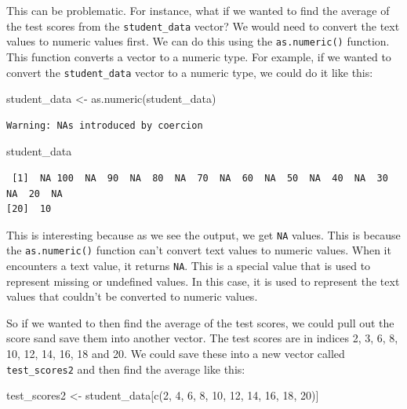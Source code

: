 \documentclass[
  letterpaper,
  DIV=11,
  numbers=noendperiod]{scrreprt}
\newenvironment{Shaded}{\begin{snugshade}}{\end{snugshade}}
\newcommand{\DecValTok}[1]{\textcolor[rgb]{0.68,0.00,0.00}{#1}}
\newcommand{\FunctionTok}[1]{\textcolor[rgb]{0.28,0.35,0.67}{#1}}
\newcommand{\NormalTok}[1]{\textcolor[rgb]{0.00,0.23,0.31}{#1}}
\newcommand{\OtherTok}[1]{\textcolor[rgb]{0.00,0.23,0.31}{#1}}
\begin{document}
This can be problematic. For instance, what if we wanted to find the
average of the test scores from the \texttt{student\_data} vector? We
would need to convert the text values to numeric values first. We can do
this using the \texttt{as.numeric()} function. This function converts a
vector to a numeric type. For example, if we wanted to convert the
\texttt{student\_data} vector to a numeric type, we could do it like
this:

\begin{Shaded}
\begin{Highlighting}[]
\NormalTok{student\_data }\OtherTok{\textless{}{-}} \FunctionTok{as.numeric}\NormalTok{(student\_data)}
\end{Highlighting}
\end{Shaded}

\begin{verbatim}
Warning: NAs introduced by coercion
\end{verbatim}

\begin{Shaded}
\begin{Highlighting}[]
\NormalTok{student\_data}
\end{Highlighting}
\end{Shaded}

\begin{verbatim}
 [1]  NA 100  NA  90  NA  80  NA  70  NA  60  NA  50  NA  40  NA  30  NA  20  NA
[20]  10
\end{verbatim}

This is interesting because as we see the output, we get \texttt{NA}
values. This is because the \texttt{as.numeric()} function can't convert
text values to numeric values. When it encounters a text value, it
returns \texttt{NA}. This is a special value that is used to represent
missing or undefined values. In this case, it is used to represent the
text values that couldn't be converted to numeric values.

So if we wanted to then find the average of the test scores, we could
pull out the score sand save them into another vector. The test scores
are in indices 2, 3, 6, 8, 10, 12, 14, 16, 18 and 20. We could save
these into a new vector called \texttt{test\_scores2} and then find the
average like this:

\begin{Shaded}
\begin{Highlighting}[]
\NormalTok{test\_scores2 }\OtherTok{\textless{}{-}}\NormalTok{ student\_data[}\FunctionTok{c}\NormalTok{(}\DecValTok{2}\NormalTok{, }\DecValTok{4}\NormalTok{, }\DecValTok{6}\NormalTok{, }\DecValTok{8}\NormalTok{, }\DecValTok{10}\NormalTok{, }\DecValTok{12}\NormalTok{, }\DecValTok{14}\NormalTok{, }\DecValTok{16}\NormalTok{, }\DecValTok{18}\NormalTok{, }\DecValTok{20}\NormalTok{)]}
\end{Highlighting}
\end{Shaded}
\end{document}
